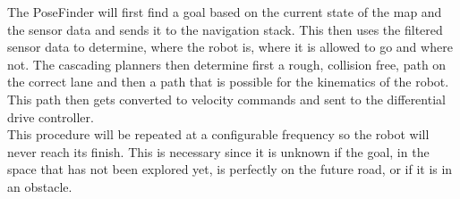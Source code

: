 The PoseFinder will first find a goal based on the current state of the map and the sensor data and sends it to the navigation stack. This then uses the filtered sensor data to determine, where the robot is, where it is allowed to go and where not. The cascading planners then determine first a rough, collision free, path on the correct lane and then a path that is possible for the kinematics of the robot. This path then gets converted to velocity commands and sent to the differential drive controller.\\
This procedure will be repeated at a configurable frequency so the robot will never reach its finish. This is necessary since it is unknown if the goal, in the space that has not been explored yet, is perfectly on the future road, or if it is in an obstacle.




